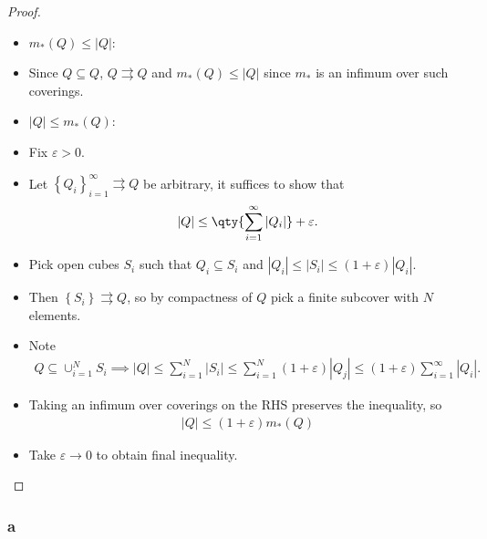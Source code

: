 \begin{solution}
\begin{proof}
\begin{itemize}
\item
  \(m_*(Q) \leq {\left\lvert {Q} \right\rvert}\):
\item
  Since \(Q\subseteq Q\), \(Q\rightrightarrows Q\) and
  \(m_*(Q) \leq {\left\lvert {Q} \right\rvert}\) since \(m_*\) is an
  infimum over such coverings.
\item
  \({\left\lvert {Q} \right\rvert} \leq m_*(Q)\):
\item
  Fix \(\varepsilon> 0\).
\item
  Let \(\left\{{Q_i}\right\}_{i=1}^\infty \rightrightarrows Q\) be
  arbitrary, it suffices to show that
  \begin{align*}{\left\lvert {Q} \right\rvert} \leq \qty{\sum_{i=1}^\infty {\left\lvert {Q_i} \right\rvert}} + \varepsilon.\end{align*}
\item
  Pick open cubes \(S_i\) such that \(Q_i\subseteq S_i\) and
  \({\left\lvert {Q_i} \right\rvert} \leq {\left\lvert {S_i} \right\rvert} \leq (1+\varepsilon){\left\lvert {Q_i} \right\rvert}\).
\item
  Then \(\left\{{S_i}\right\} \rightrightarrows Q\), so by compactness
  of \(Q\) pick a finite subcover with \(N\) elements.
\item
  Note
  \begin{align*}
  Q \subseteq \cup_{i=1}^N S_i \implies {\left\lvert {Q} \right\rvert} \leq \sum_{i=1}^N {\left\lvert {S_i} \right\rvert} \leq \sum_{i=1}^N (1+\varepsilon) {\left\lvert {Q_j} \right\rvert} \leq (1+\varepsilon)\sum_{i=1}^\infty {\left\lvert {Q_i } \right\rvert} 
  .\end{align*}
\item
  Taking an infimum over coverings on the RHS preserves the inequality,
  so
  \begin{align*}{\left\lvert {Q} \right\rvert} \leq (1+\varepsilon) m_*(Q)\end{align*}
\item
  Take \(\varepsilon\to 0\) to obtain final inequality.
\end{itemize}

\end{proof}

\hypertarget{a}{%
\subsubsection{a}\label{a}}


\end{solution}
